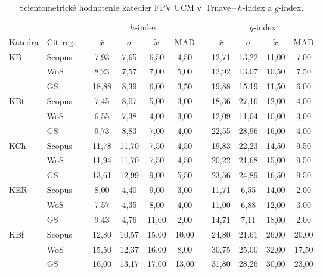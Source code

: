 \begin{table}
  \centering\small
  \caption[Hodnotenie FPV\,--\,$h$-index a $g$-index]%
  {Scientometrické hodnotenie katedier FPV UCM v~Trnave\,--\,$h$-index a $g$-index.}
  \label{tab:3-staff.results}
  \begin{tabularx}{\textwidth}{XXp{1ex}ccccp{1ex}cccc}
    \toprule
    & & & \multicolumn{4}{c}{$h$-index} & & \multicolumn{4}{c}{$g$-index} \\
    \cmidrule{4-7}\cmidrule{9-12}
    Katedra & Cit.\,reg. & & $\bar{x}$ & $\sigma$ & $\tilde{x}$ & MAD & & $\bar{x}$ & $\sigma$ & $\tilde{x}$ & MAD \\
    \midrule
    KB   & Scopus & & 7,93  & 7,65  & 6,50  & 4,50  & & 12,71 & 13,22 & 11,00 & 7,00  \\
         & WoS    & & 8,23  & 7,57  & 7,00  & 5,00  & & 12,92 & 13,07 & 10,50 & 7,50  \\
         & GS     & & 18,88 & 8,39  & 6,00  & 3,50  & & 19,88 & 15,19 & 11,50 & 6,00  \\[1ex]
    KBt  & Scopus & & 7,45  & 8,07  & 5,00  & 3,00  & & 18,36 & 27,16 & 12,00 & 4,00  \\
         & WoS    & & 6,55  & 7,38  & 4,00  & 3,00  & & 12,09 & 11,04 & 10,00 & 3,00  \\
         & GS     & & 9,73  & 8,83  & 7,00  & 4,00  & & 22,55 & 28,96 & 16,00 & 4,00  \\[1ex]
    KCh  & Scopus & & 11,78 & 11,70 & 7,50  & 4,50  & & 19,83 & 22,23 & 14,50 & 9,50  \\
         & WoS    & & 11,94 & 11,70 & 7,50  & 4,50  & & 20,22 & 21,68 & 15,00 & 9,50  \\
         & GS     & & 13,61 & 12,99 & 9,00  & 5,50  & & 23,56 & 24,89 & 16,50 & 9,50  \\[1ex]
    KER  & Scopus & & 8,00  & 4,40  & 9,00  & 3,00  & & 11,71 & 6,55  & 14,00 & 2,00  \\
         & WoS    & & 7,57  & 4,35  & 8,00  & 4,00  & & 11,00 & 6,88  & 12,00 & 3,00  \\
         & GS     & & 9,43  & 4,76  & 11,00 & 2,00  & & 14,71 & 7,11  & 18,00 & 2,00  \\[1ex]
    KBf  & Scopus & & 12,80 & 10,57 & 15,00 & 10,00 & & 24,80 & 21,61 & 26,00 & 20,00 \\
         & WoS    & & 15,50 & 12,37 & 16,00 & 8,00  & & 30,75 & 25,00 & 32,00 & 17,50 \\
         & GS     & & 16,00 & 13,17 & 17,00 & 13,00 & & 31,80 & 28,26 & 30,00 & 23,00 \\[1ex]

\end{tabularx}
\end{table}
